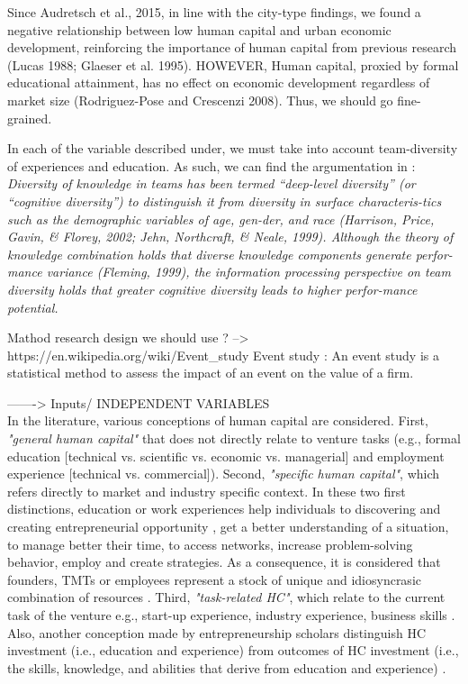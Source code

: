 \begin{itemize}
\begin{itemize}
Since Audretsch et al., 2015, in line with the city-type findings, we found a negative relationship between low human capital and urban economic development, reinforcing the importance of human capital from previous research (Lucas 1988; Glaeser et al. 1995). HOWEVER, Human capital, proxied by formal educational attainment, has no effect on economic development regardless of market size (Rodriguez-Pose and Crescenzi 2008). Thus, we should go fine-grained.

In each of the variable described under, we must take into account team-diversity of experiences and education. As such, we can find the argumentation in \citet{taylor2006superman} : \textit{Diversity of knowledge in teams has been termed “deep-level diversity” (or “cognitive diversity”) to distinguish it from diversity in surface characteris-tics such as the demographic variables of age, gen-der, and race (Harrison, Price, Gavin, & Florey, 2002; Jehn, Northcraft, & Neale, 1999). Although the theory of knowledge combination holds that diverse knowledge components generate perfor-mance variance (Fleming, 1999), the information processing perspective on team diversity holds that greater cognitive diversity leads to higher perfor-mance potential.}

Mathod research design we should use ?
--> https://en.wikipedia.org/wiki/Event_study Event study : An event study is a statistical method to assess the impact of an event on the value of a firm.

-------> Inputs/ INDEPENDENT VARIABLES\\

In the literature, various conceptions of human capital are considered. First, \textit{"general human capital"} that does not directly relate to venture tasks (e.g., formal education [technical vs. scientific vs. economic vs. managerial] and employment experience [technical vs. commercial]). Second, \textit{"specific human capital"}, which refers directly to market and industry specific context. In these two first distinctions, education or work experiences help individuals to discovering and creating entrepreneurial opportunity \citep{marvel2016human}, get a better understanding of a situation, to manage better their time, to access networks, increase problem-solving behavior, employ and create strategies. As a consequence, it is considered that founders, TMTs or employees represent a stock of unique and idiosyncrasic combination of resources \citet{becker1964human}. Third, \textit{"task-related HC"}, which relate to the current task of the venture e.g., start-up experience, industry experience, business skills \citep{gibbons2004task}. Also, another conception made by entrepreneurship scholars distinguish HC investment (i.e., education and experience) from outcomes of HC investment (i.e., the skills, knowledge, and abilities that derive from education and experience) \citep{unger2011human, marvel2016human}.


\end{itemize}
\end{itemize}

